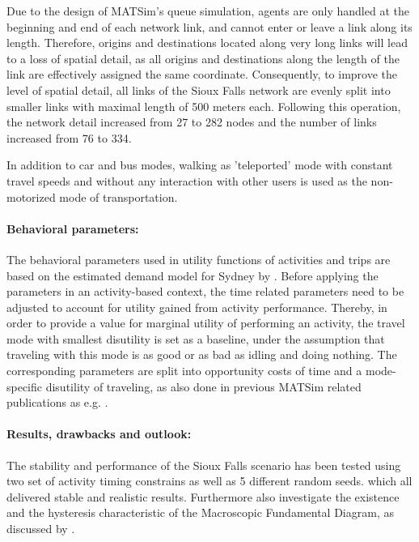 Due to the design of MATSim’s queue simulation, agents are only handled at the beginning and end of each network link, and cannot enter or leave a link along its length. Therefore, origins and destinations located along very long links will lead to a loss of spatial detail, as all origins and destinations along the length of the link are effectively assigned the same coordinate. Consequently, to improve the level of spatial detail, all links of the Sioux Falls network are evenly split into smaller links with maximal length of 500 meters each. Following this operation, the network detail increased from 27 to 282 nodes and the number of links increased from 76 to 334.

In addition to car and bus modes, walking as 'teleported' mode with constant travel speeds and without any interaction with other users is used as the non-motorized mode of transportation. 

\paragraph{Behavioral parameters:}

The behavioral parameters used in utility functions of activities and trips are based on the estimated demand model for Sydney by \citet[][]{TirachiniHensherRose_TransResB_2014}. Before applying the parameters in an activity-based context, the time related parameters need to be adjusted to account for utility gained from activity performance. Thereby, in order to provide a value for marginal utility of performing an activity, the travel mode with smallest disutility is set as a baseline, under the assumption that traveling with this mode is as good or as bad as idling and doing nothing. The corresponding parameters are split into opportunity costs of time and a mode-specific disutility of traveling, as also done in previous MATSim related publications as e.g. \citet[][]{KickhoeferEtAl_Transportation_2011}. 

\paragraph{Results, drawbacks and outlook:}

The stability and performance of the Sioux Falls scenario has been tested using two set of activity timing constrains as well as 5 different random seeds. which all delivered stable and realistic results. Furthermore \citet[][]{ChakirovFourie_TechRep_FCL_2014} also investigate the existence and the hysteresis characteristic of the Macroscopic Fundamental Diagram, as discussed  by \cite[][]{GeroliminisDaganzo_TRB_2007, GeroliminisDaganzo_TransResB_2008, GeroliminisSun_TransResA_2011}. 

